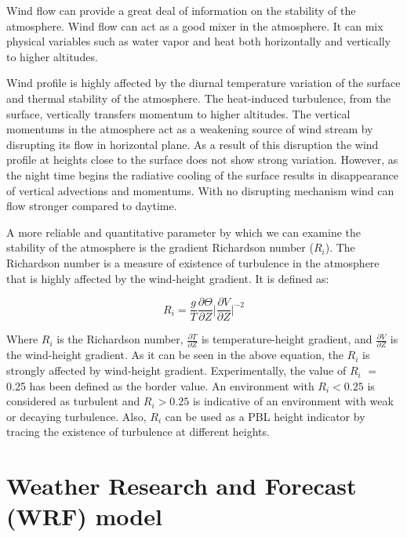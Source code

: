 \documentclass[a4paper,12pt]{article}
\numberwithin{equation}{section} %
\begin{document}
Wind flow can provide a great deal of information on the stability of the atmosphere. Wind flow can act as a good mixer in the atmosphere. It can mix physical variables such as water vapor and heat both horizontally and vertically to higher altitudes.

Wind profile is highly affected by the diurnal temperature variation of the surface and thermal stability of the atmosphere. The heat-induced turbulence, from the surface, vertically transfers momentum to higher altitudes. The vertical momentums in the atmosphere act as a weakening source of wind stream by disrupting its flow in horizontal plane. As a result of this disruption the wind profile at heights close to the surface does not show strong variation. However, as the night time begins the radiative cooling of the surface results in disappearance of vertical advections and momentums. With no disrupting mechanism wind can flow stronger compared to daytime.

A more reliable and quantitative parameter by which we can examine the stability of the atmosphere is the gradient Richardson number ($R_i$). The Richardson number is a measure of existence of turbulence in the atmosphere that is highly affected by the wind-height gradient. It is defined as:

\vspace{0.25cm}
\begin{equation}\label{ea:Ri}
R_i = \frac{g}{T}\frac{\partial\Theta}{\partial Z}\Big|\frac{\partial V}{\partial Z}\Big|^{-2}
\end{equation}
\vspace{0.25cm}

Where $R_i$ is the Richardson number, $\frac{\partial T}{\partial Z}$ is temperature-height gradient, and $\frac{\partial V}{\partial Z}$ is the wind-height gradient. As it can be seen in the above equation, the $R_i$ is strongly affected by wind-height gradient. Experimentally, the value of $R_i$ $=$ 0.25 has been defined as the border value. An environment with $R_i < 0.25$ is considered as turbulent and $R_i > 0.25$ is indicative of an environment with weak or decaying turbulence. Also, $R_i$ can be used as a PBL height indicator by tracing the existence of turbulence at different heights.

\newpage

\section{Weather Research and Forecast (WRF) model}
\end{document}
